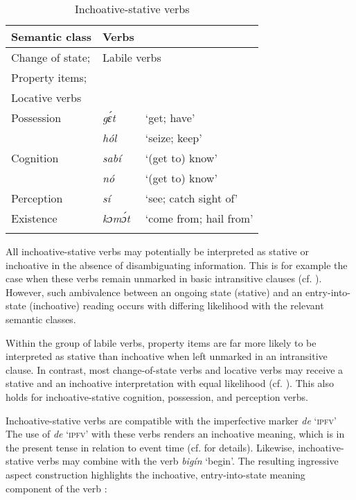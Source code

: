 \begin{table}
\caption{Inchoative-stative verbs}
\label{tab:key:6.2}

\begin{tabularx}{.8\textwidth}{Xll}
\lsptoprule
Semantic class & Verbs & \\
\midrule
Change of state; & \multicolumn{2}{l}{Labile verbs}\\
Property items; & \\
Locative verbs & \\

\tablevspace
Possession & \itshape gɛ́t & ‘get; have’\\
& \itshape hól & ‘seize; keep’\\

\tablevspace
Cognition & \itshape sabí & ‘(get to) know’\\
& \itshape nó & ‘(get to) know’\\

\tablevspace
Perception & \itshape sí & ‘see; catch sight of’\\

\tablevspace
Existence & \itshape kɔmɔ́t & ‘come from; hail from’\\
\lspbottomrule
\end{tabularx}
\end{table}

All inchoative-stative verbs may potentially be interpreted as stative or inchoative in the absence of disambiguating information. This is for example the case when these verbs remain unmarked in basic intransitive clauses (cf. ). However, such ambivalence between an ongoing state (stative) and an entry-into-state (inchoative) reading occurs with differing likelihood with the relevant semantic classes. 


Within the group of labile verbs, property items are far more likely to be interpreted as stative than inchoative when left unmarked in an intransitive clause. In contrast, most change-of-state verbs and locative verbs may receive a stative and an inchoative interpretation with equal likelihood (cf. ). This also holds for inchoative-stative cognition, possession, and perception verbs. 



Inchoative-stative verbs are compatible with the imperfective marker \textit{de} ‘\textsc{ipfv’}  The use of \textit{de} ‘\textsc{ipfv’} with these verbs renders an inchoative meaning, which is in the present tense in relation to event time (cf.  for details). Likewise, inchoative-stative verbs may combine with the verb \textit{bigín} ‘begin’. The resulting ingressive aspect construction highlights the inchoative, entry-into-state meaning component of the verb :



